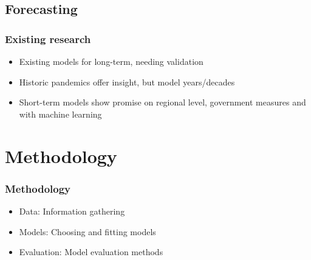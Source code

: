 \documentclass[aspectratio=169,classic]{uva-inf-presentation}
\begin{document}
\onecolumn



\subsection{Forecasting}
\begin{frame}
\frametitle{Existing research}
\begin{itemize}
    \item Existing models for long-term, needing validation \cite{chudik2020economic, baldwin2020economics, fernandes2020economic}
    \item Historic pandemics offer insight, but model years/decades \cite{osterholm2017preparing, correia1918pandemics, jorda2020longer}
    \item Short-term models show promise on regional level, government measures and with machine learning \cite{zhao2020preliminary, deb2020economic, carpi2021twitter}
\end{itemize}
\end{frame}






\section{Methodology}
\begin{frame}
\frametitle{Methodology}
\begin{itemize}
    \item Data: Information gathering
    \item Models: Choosing and fitting models
    \item Evaluation: Model evaluation methods
\end{itemize}
\end{frame}
\end{document}
